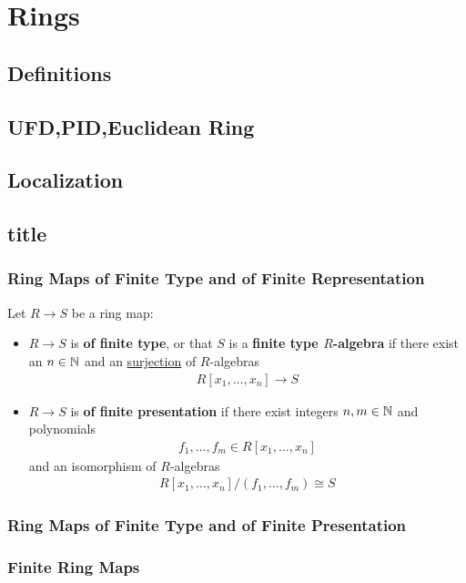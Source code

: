 \documentclass[Total.tex]{subfiles}
\begin{document}
	\chapter{Rings}
		\section{Definitions}
		\section{UFD,PID,Euclidean Ring}
		\section{Localization}
		\section{title}
			\subsection{Ring Maps of Finite Type and of Finite Representation}
			\begin{Def}
				Let $R\rightarrow S$ be a ring map:
				\begin{itemize}
					\item $R\rightarrow S$ is \textbf{of finite type}, or that $S$ is a \textbf{finite type $R$-algebra} if there exist an $n\in \mathbb{N}$ and an \underline{surjection} of $R$-algebras
					\begin{gather*}
						R[x_1,\dots,x_n]\rightarrow S
					\end{gather*}
					\item $R\rightarrow S$ is \textbf{of finite presentation} if there exist integers $n,m\in \mathbb{N}$ and polynomials
					\begin{gather*}
						f_1,\dots,f_m\in R[x_1,\dots,x_n]
					\end{gather*}
					and an isomorphism of $R$-algebras
					\begin{gather*}
						R[x_1,\dots,x_n]/(f_1,\dots,f_m)\cong S
					\end{gather*}
				\end{itemize}
			\end{Def}
			\subsection{Ring Maps of Finite Type and of Finite Presentation}
			\subsection{Finite Ring Maps}
\end{document}
